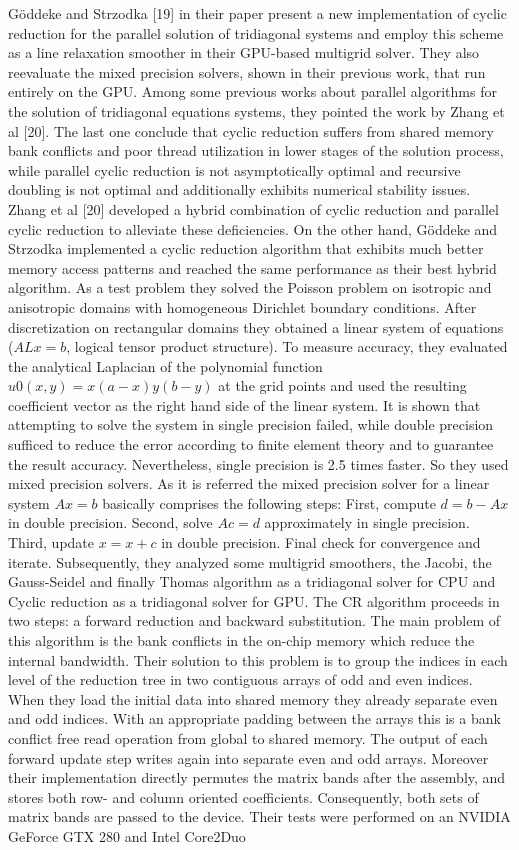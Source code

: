 Göddeke and Strzodka [19] in their paper present a new implementation of cyclic reduction for the parallel solution of tridiagonal systems and employ this scheme as a line relaxation smoother in their GPU-based multigrid solver. They also reevaluate the mixed precision solvers, shown in their previous work, that run entirely on the GPU. Among some previous works about parallel algorithms for the solution of tridiagonal equations systems, they pointed the work by Zhang et al [20]. The last one conclude that cyclic reduction suffers from shared memory bank conflicts and poor thread utilization in lower stages of the solution process, while parallel cyclic reduction is not asymptotically optimal and recursive doubling is not optimal and additionally exhibits numerical stability issues. Zhang et al [20] developed a hybrid combination of cyclic reduction and parallel cyclic reduction to alleviate these deficiencies. On the other hand, Göddeke and Strzodka implemented a cyclic reduction algorithm that exhibits much better memory access patterns and reached the same performance as their best hybrid algorithm. As a test problem they solved the Poisson problem on isotropic and anisotropic domains with homogeneous Dirichlet boundary conditions. After discretization on rectangular domains they obtained a linear system of equations ($ALx = b$, logical tensor product structure). To measure accuracy, they evaluated the analytical Laplacian of the polynomial function $u0(x, y) = x(a-x)y(b-y)$ at the grid points and used the resulting coefficient vector as the right hand side of the linear system. It is shown that attempting to solve the system in single precision failed, while double precision sufficed to reduce the error according to finite element theory and to guarantee the result accuracy. Nevertheless, single precision is 2.5 times faster. So they used mixed precision solvers. As it is referred the mixed precision solver for a linear system $Ax = b$ basically comprises the following steps: First, compute $d = b - Ax$ in double precision. Second, solve $Ac = d$ approximately in single precision. Third, update $x = x + c$ in double precision. Final check for convergence and iterate. Subsequently, they analyzed some multigrid smoothers, the Jacobi, the Gauss-Seidel and finally Thomas algorithm as a tridiagonal solver for CPU and Cyclic reduction as a tridiagonal solver for GPU. The CR algorithm proceeds in two steps: a forward reduction and backward substitution. The main problem of this algorithm is the bank conflicts in the on-chip memory which reduce the internal bandwidth. Their solution to this problem is to group the indices in each level of the reduction tree in two contiguous arrays of odd and even indices. When they load the initial data into shared memory they already separate even and odd indices. With an appropriate padding between the arrays this is a bank conflict free read operation from global to shared memory. The output of each forward update step writes again into separate even and odd arrays. Moreover their implementation directly permutes the matrix bands after the assembly, and stores both row- and column oriented coefficients. Consequently, both sets of matrix bands are passed to the device. Their tests were performed on an NVIDIA GeForce GTX 280 and Intel Core2Duo 